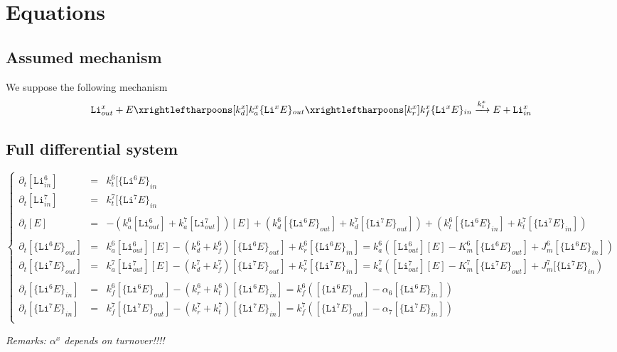 \documentclass[aps,onecolumn]{revtex4}
\newcommand{\mychem}[1]{\mathtt{#1}}
\begin{document}
\section{Equations}
\subsection{Assumed mechanism}
We suppose the following mechanism
\begin{equation}
	\mychem{Li}^{x}_{out} + E \xrightleftharpoons[k_d^{x}]{k_a^{x}}
	\lbrace\mychem{Li}^xE\rbrace_{out} 
	\xrightleftharpoons[k_r^{x}]{k_f^{x}} 
	\lbrace\mychem{Li}^xE\rbrace_{in}
	\xrightarrow{k_t^x} E + \mychem{Li}^{x}_{in}
\end{equation}

\subsection{Full differential system}
\begin{equation}
	\left\lbrace
	\begin{array}{ccl}
	\partial_t [\mychem{Li}^6_{in}] & = &k_t^6[\lbrace\mychem{Li}^6E\rbrace_{in}  \\
	\partial_t [\mychem{Li}^7_{in}] & = &k_t^7[\lbrace\mychem{Li}^7E\rbrace_{in}  \\
	\\
	\partial_t [E] & = &
	-\left(k_a^6[\mychem{Li}^6_{out}]+k_a^7[\mychem{Li}^7_{out}]\right)[E] 
	+\left(k_d^6[\lbrace\mychem{Li}^6E\rbrace_{out}]+k_d^7[\lbrace\mychem{Li}^7E\rbrace_{out}]\right)
	+\left(k_t^6[\lbrace\mychem{Li}^6E\rbrace_{in} ]+k_t^7[\lbrace\mychem{Li}^7E\rbrace_{in} ]\right)
	\\
	\\
	\partial_t[\lbrace\mychem{Li}^6E\rbrace_{out}] & = & 
	k_a^6[\mathtt{Li}^6_{out}][E] - (k_d^6+k_f^6) [\lbrace\mychem{Li}^6E\rbrace_{out}]
	+k_r^6[\lbrace\mychem{Li}^6E\rbrace_{in}]
	= k_a^6 \left([\mathtt{Li}^6_{out}][E] -K_m^6 [\lbrace\mychem{Li}^6E\rbrace_{out}] + J_m^6 [\lbrace\mychem{Li}^6E\rbrace_{in}]\right)
	\\
	\partial_t[\lbrace\mychem{Li}^7E\rbrace_{out}] & = & 
	k_a^7[\mathtt{Li}^7_{out}][E] - (k_d^7+k_f^7) [\lbrace\mychem{Li}^7E\rbrace_{out}]
	+k_r^7[\lbrace\mychem{Li}^7E\rbrace_{in}]
	= k_a^7 \left([\mathtt{Li}^7_{out}][E] -K_m^7 [\lbrace\mychem{Li}^7E\rbrace_{out}] + J_m^7 [\lbrace\mychem{Li}^7E\rbrace_{in}\right)
	\\
	\\
	\partial_t[\lbrace\mychem{Li}^6E\rbrace_{in}] & = & 
	k_f^6 [\lbrace\mychem{Li}^6E\rbrace_{out}] - (k_r^6+k_t^6) [\lbrace\mychem{Li}^6E\rbrace_{in}]
	= k_f^6 \left( [\lbrace\mychem{Li}^6E\rbrace_{out}] - \alpha_6 [\lbrace\mychem{Li}^6E\rbrace_{in}]\right)
	\\
	\partial_t[\lbrace\mychem{Li}^7E\rbrace_{in}] & = & 
	k_f^7 [\lbrace\mychem{Li}^7E\rbrace_{out}] - (k_r^7+k_t^7) [\lbrace\mychem{Li}^7E\rbrace_{in}]
	= k_f^7 \left( [\lbrace\mychem{Li}^7E\rbrace_{out}] - \alpha_7 [\lbrace\mychem{Li}^7E\rbrace_{in}]\right)
	\\
	\end{array}
	\right. 
\end{equation}
\centerline{\it Remarks: $\alpha^x$ depends on turnover!!!!}
\end{document}
